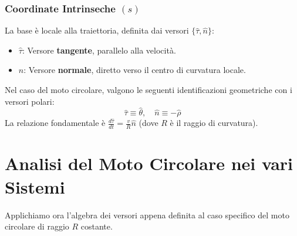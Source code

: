 \subsubsection{Coordinate Intrinseche \texorpdfstring{$(s)$}{(s)}}
La base è locale alla traiettoria, definita dai versori $\{\hat{\tau}, \hat{n}\}$:
\begin{itemize}
    \item $\hat{\tau}$: Versore \textbf{tangente}, parallelo alla velocità.
    \item $\hat{n}$: Versore \textbf{normale}, diretto verso il centro di curvatura locale.
\end{itemize}

\begin{center}
\end{center}

Nel caso del moto circolare, valgono le seguenti identificazioni geometriche con i versori polari:
\begin{equation}
    \hat{\tau} \equiv \hat{\theta}, \quad \hat{n} \equiv -\hat{\rho}
\end{equation}
La relazione fondamentale è $\frac{d\hat{\tau}}{dt} = \frac{v}{R} \hat{n}$ (dove $R$ è il raggio di curvatura).

\section{Analisi del Moto Circolare nei vari Sistemi}
Applichiamo ora l'algebra dei versori appena definita al caso specifico del moto circolare di raggio $R$ costante.

